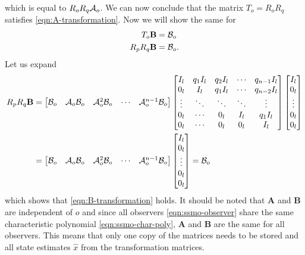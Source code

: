 which is equal to $R_oR_q\mathcal{A}_o$. We can now conclude that the matrix $T_o=R_oR_q$ satisfies \eqref{eqn:A-transformation}. Now we will show the same for
\begin{equation}\label{eqn:B-transformation}
    \begin{split}
        T_o\mathbf{B} &= \mathcal{B}_o \\
        R_pR_q\mathbf{B} &= \mathcal{B}_o.
    \end{split}
\end{equation}
Let us expand
\begin{equation*}
    \begin{split}
        R_pR_q\mathbf{B} &=
        \begin{bmatrix}
            \mathcal{B}_o & \mathcal{A}_o\mathcal{B}_o & \mathcal{A}^{2}_o\mathcal{B}_o & \cdots & \mathcal{A}^{n-1}_o\mathcal{B}_o \\
        \end{bmatrix}
        \begin{bmatrix}
            I_l & q_1I_l & q_2I_l & \cdots & q_{n-1}I_l \\
            0_l & I_l & q_1I_l & \cdots & q_{n-2}I_l \\
            \vdots & \ddots & \ddots & \ddots & \vdots \\
            0_l & \cdots & 0_l & I_l & q_1I_l \\
            0_l & \cdots & 0_l & 0_l & I_l \\
        \end{bmatrix}
        \begin{bmatrix}
            I_l \\ 0_l \\ \vdots \\ 0_l \\ 0_l \\
        \end{bmatrix} \\
        &=
        \begin{bmatrix}
            \mathcal{B}_o & \mathcal{A}_o\mathcal{B}_o & \mathcal{A}^{2}_o\mathcal{B}_o & \cdots & \mathcal{A}^{n-1}_o\mathcal{B}_o \\
        \end{bmatrix}
        \begin{bmatrix}
            I_l \\ 0_l \\ \vdots \\ 0_l \\ 0_l \\
        \end{bmatrix} = \mathcal{B}_o \\
    \end{split}
\end{equation*}
which shows that \eqref{eqn:B-transformation} holds. It should be noted that $\mathbf{A}$ and $\mathbf{B}$ are independent of $o$ and since all observers \eqref{eqn:ssmo-observer} share the same characteristic polynomial \eqref{eqn:ssmo-char-poly}, $\mathbf{A}$ and $\mathbf{B}$ are the same for all observers. This means that only one copy of the matrices needs to be stored and all state estimates $\hat{x}$ from the transformation matrices.

